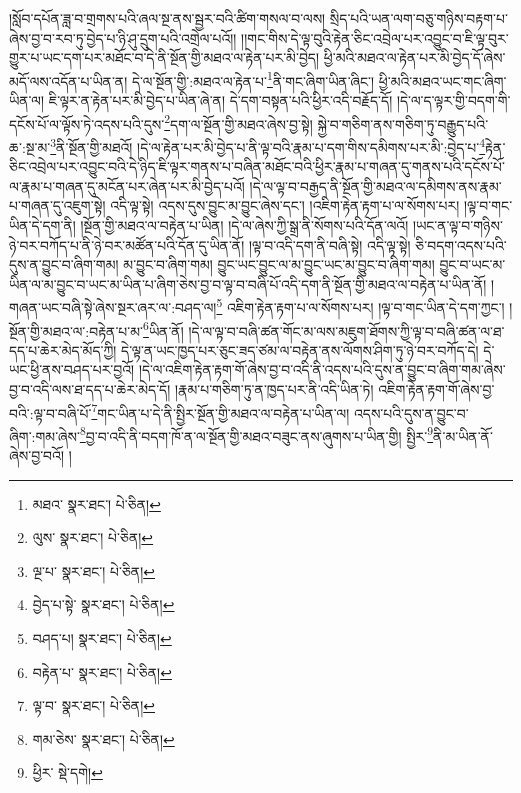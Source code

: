 །སློབ་དཔོན་ཟླ་བ་གྲགས་པའི་ཞལ་སྔ་ནས་སྦྱར་བའི་ཚིག་གསལ་བ་ལས། སྲིད་པའི་ཡན་ལག་བཅུ་གཉིས་བརྟག་པ་ཞེས་བྱ་བ་རབ་ཏུ་བྱེད་པ་ཉི་ཤུ་དྲུག་པའི་འགྲེལ་པའོ།། །།གང་གིས་དེ་ལྟ་བུའི་རྟེན་ཅིང་འབྲེལ་པར་འབྱུང་བ་ཇི་ལྟ་བུར་གྱུར་པ་ཡང་དག་པར་མཐོང་བ་དེ་ནི་སྔོན་གྱི་མཐའ་ལ་རྟེན་པར་མི་བྱེད། ཕྱི་མའི་མཐའ་ལ་རྟེན་པར་མི་བྱེད་དོ་ཞེས་མདོ་ལས་འདོན་པ་ཡིན་ན། དེ་ལ་སྔོན་གྱི་:མཐའ་ལ་རྟེན་པ་\footnote{མཐའ་  སྣར་ཐང་།  པེ་ཅིན། }ནི་གང་ཞིག་ཡིན་ཞིང་། ཕྱི་མའི་མཐའ་ཡང་གང་ཞིག་ཡིན་ལ། ཇི་ལྟར་ན་རྟེན་པར་མི་བྱེད་པ་ཡིན་ཞེ་ན། དེ་དག་བསྟན་པའི་ཕྱིར་འདི་བརྗོད་དོ། །དེ་ལ་ད་ལྟར་གྱི་བདག་གི་དངོས་པོ་ལ་ལྟོས་ཏེ་འདས་པའི་དུས་\footnote{ལུས་  སྣར་ཐང་།  པེ་ཅིན། }དག་ལ་སྔོན་གྱི་མཐའ་ཞེས་བྱ་སྟེ། སྐྱེ་བ་གཅིག་ནས་གཅིག་ཏུ་བརྒྱུད་པའི་ཆ་:སྔ་མ་\footnote{ལྔ་པ་  སྣར་ཐང་།  པེ་ཅིན། }ནི་སྔོན་གྱི་མཐའོ། །དེ་ལ་རྟེན་པར་མི་བྱེད་པ་ནི་ལྟ་བའི་རྣམ་པ་དག་གིས་དམིགས་པར་མི་:བྱེད་པ་\footnote{བྱེད་པ་སྟེ་  སྣར་ཐང་།  པེ་ཅིན། }རྟེན་ཅིང་འབྲེལ་པར་འབྱུང་བའི་དེ་ཉིད་ཇི་ལྟར་གནས་པ་བཞིན་མཐོང་བའི་ཕྱིར་རྣམ་པ་གཞན་དུ་གནས་པའི་དངོས་པོ་ལ་རྣམ་པ་གཞན་དུ་མངོན་པར་ཞེན་པར་མི་བྱེད་པའོ། །དེ་ལ་ལྟ་བ་བརྒྱད་ནི་སྔོན་གྱི་མཐའ་ལ་དམིགས་ནས་རྣམ་པ་གཞན་དུ་འཇུག་སྟེ། འདི་ལྟ་སྟེ། འདས་དུས་བྱུང་མ་བྱུང་ཞེས་དང་། །འཇིག་རྟེན་རྟག་པ་ལ་སོགས་པར། །ལྟ་བ་གང་ཡིན་དེ་དག་ནི། །སྔོན་གྱི་མཐའ་ལ་བརྟེན་པ་ཡིན། །དེ་ལ་ཞེས་ཀྱི་སྒྲ་ནི་སོགས་པའི་དོན་ལའོ། །ཡང་ན་ལྟ་བ་གཉིས་ཉེ་བར་བཀོད་པ་ནི་ཉེ་བར་མཚོན་པའི་དོན་དུ་ཡིན་ནོ། །ལྟ་བ་འདི་དག་ནི་བཞི་སྟེ། འདི་ལྟ་སྟེ། ཅི་བདག་འདས་པའི་དུས་ན་བྱུང་བ་ཞིག་གམ། མ་བྱུང་བ་ཞིག་གམ། བྱུང་ཡང་བྱུང་ལ་མ་བྱུང་ཡང་མ་བྱུང་བ་ཞིག་གམ། བྱུང་བ་ཡང་མ་ཡིན་ལ་མ་བྱུང་བ་ཡང་མ་ཡིན་པ་ཞིག་ཅེས་བྱ་བ་ལྟ་བ་བཞི་པོ་འདི་དག་ནི་སྔོན་གྱི་མཐའ་ལ་བརྟེན་པ་ཡིན་ནོ། །གཞན་ཡང་བཞི་སྟེ་ཞེས་སྔར་ཞར་ལ་:བཤད་ལ།\footnote{བཤད་པ།  སྣར་ཐང་།  པེ་ཅིན། } འཇིག་རྟེན་རྟག་པ་ལ་སོགས་པར། །ལྟ་བ་གང་ཡིན་དེ་དག་ཀྱང་། །སྔོན་གྱི་མཐའ་ལ་:བརྟེན་པ་མ་\footnote{བརྟེན་པ་  སྣར་ཐང་།  པེ་ཅིན། }ཡིན་ནོ། །དེ་ལ་ལྟ་བ་བཞི་ཚན་གོང་མ་ལས་མཇུག་ཐོགས་ཀྱི་ལྟ་བ་བཞི་ཚན་ལ་ཐ་དད་པ་ཆེར་མེད་མོད་ཀྱི། དེ་ལྟ་ན་ཡང་ཁྱད་པར་ཅུང་ཟད་ཙམ་ལ་བརྟེན་ནས་ལོགས་ཤིག་ཏུ་ཉེ་བར་བཀོད་དེ། དེ་ཡང་ཕྱི་ནས་བཤད་པར་བྱའོ། །དེ་ལ་འཇིག་རྟེན་རྟག་གོ་ཞེས་བྱ་བ་འདི་ནི་འདས་པའི་དུས་ན་བྱུང་བ་ཞིག་གམ་ཞེས་བྱ་བ་འདི་ལས་ཐ་དད་པ་ཆེར་མེད་དོ། །རྣམ་པ་གཅིག་ཏུ་ན་ཁྱད་པར་ནི་འདི་ཡིན་ཏེ། འཇིག་རྟེན་རྟག་གོ་ཞེས་བྱ་བའི་:ལྟ་བ་བཞི་པོ་\footnote{ལྟ་བ་  སྣར་ཐང་།  པེ་ཅིན། }གང་ཡིན་པ་དེ་ནི་སྤྱིར་སྔོན་གྱི་མཐའ་ལ་བརྟེན་པ་ཡིན་ལ། འདས་པའི་དུས་ན་བྱུང་བ་ཞིག་:གམ་ཞེས་\footnote{གམ་ཅེས་  སྣར་ཐང་།  པེ་ཅིན། }བྱ་བ་འདི་ནི་བདག་ཁོ་ན་ལ་སྔོན་གྱི་མཐའ་བཟུང་ནས་ཞུགས་པ་ཡིན་གྱི། སྤྱིར་\footnote{ཕྱིར་  སྡེ་དགེ། }ནི་མ་ཡིན་ནོ་ཞེས་བྱ་བའོ། །
